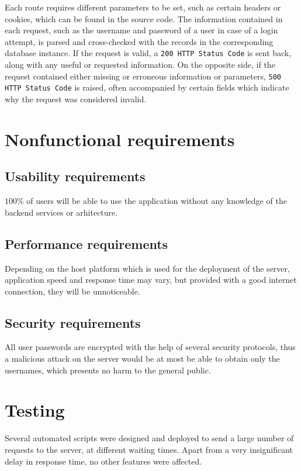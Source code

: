 \documentclass{article}
\begin{document}
\noindent Each route requires different parameters to be set, such as certain headers or cookies, which can be found in the source code. The information contained in each request, such as the username and password of a user in case of a login attempt, is parsed and cross-checked with the records in the corresponding database instance. If the request is valid, a \verb+200 HTTP Status Code+ is sent back, along with any useful or requested information. On the opposite side, if the request contained either missing or erroneous information or parameters, \verb+500 HTTP Status Code+ is raised, often accompanied by certain fields which indicate why the request was considered invalid.

\section{Nonfunctional requirements}
\subsection{Usability requirements}
$ 100\% $ of users will be able to use the application without any knowledge of the backend services or arhitecture.

\subsection{Performance requirements}
Depending on the host platform which is used for the deployment of the server, application speed and response time may vary, but provided with a good internet connection, they will be unnoticeable.

\subsection{Security requirements}
All user passwords are encrypted with the help of several security protocols, thus a malicious attack on the server would be at most be able to obtain only the usernames, which presents no harm to the general public.

\section{Testing}
Several automated scripts were designed and deployed to send a large number of requests to the server, at different waiting times. Apart from a very insignificant delay in response time, no other features were affected.
\end{document}
